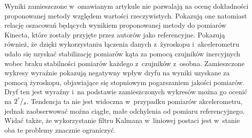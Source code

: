 Wyniki zamieszczone w~omawianym artykule \cite{Bo2011a} nie pozwalają na ocenę dokładności proponowanej metody względem wartości rzeczywistych. Pokazują one natomiast relację oszacowań będących wynikiem proponowanej metody do pomiarów Kinecta, które zostały przyjęte przez autorów jako referencyjne. Pokazują również, że dzięki wykorzystaniu łączenia danych z~żyroskopu i~akcelerometru udało się uzyskać stabilizację pomiarów kąta za pomocą czujników inercyjnych wobec braku stabilności pomiarów każdego z~czujników z~osobna. Zamieszczone wykresy wyraźnie pokazują negatywny wpływ dryfu na wyniki uzyskane za pomocą żyroskopu, objawiające się stopniowym pogarszaniem jakości pomiarów. Dryf ten jest wyraźny i~na podstawie zamieszczonych wykresów można go ocenić na $2^\degree/_s$. Tendencja ta nie jest widoczna w~przypadku pomiarów akcelerometru, jednak zaobserwować można ciągłe, małe odchylenia od pomiaru referencyjnego. Widać także, że wykorzystanie filtru Kalmana w~liniowej postaci jest w~stanie oba te problemy znacznie ograniczyć.																																																	

